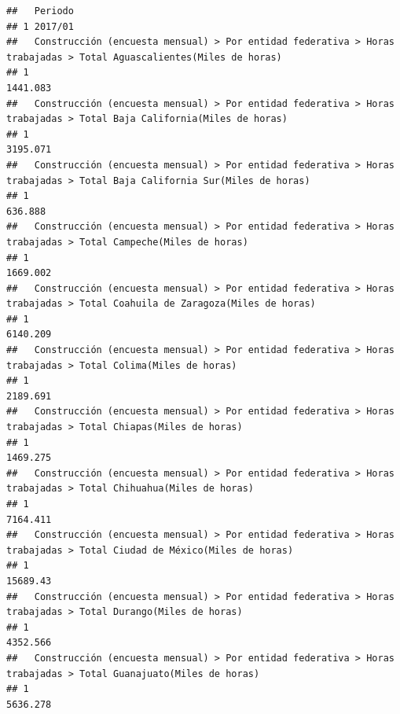 \documentclass[
]{article}
\begin{document}
\begin{verbatim}
##   Periodo
## 1 2017/01
##   Construcción (encuesta mensual) > Por entidad federativa > Horas trabajadas > Total Aguascalientes(Miles de horas) 
## 1                                                                                                            1441.083
##   Construcción (encuesta mensual) > Por entidad federativa > Horas trabajadas > Total Baja California(Miles de horas) 
## 1                                                                                                             3195.071
##   Construcción (encuesta mensual) > Por entidad federativa > Horas trabajadas > Total Baja California Sur(Miles de horas) 
## 1                                                                                                                  636.888
##   Construcción (encuesta mensual) > Por entidad federativa > Horas trabajadas > Total Campeche(Miles de horas) 
## 1                                                                                                      1669.002
##   Construcción (encuesta mensual) > Por entidad federativa > Horas trabajadas > Total Coahuila de Zaragoza(Miles de horas) 
## 1                                                                                                                  6140.209
##   Construcción (encuesta mensual) > Por entidad federativa > Horas trabajadas > Total Colima(Miles de horas) 
## 1                                                                                                    2189.691
##   Construcción (encuesta mensual) > Por entidad federativa > Horas trabajadas > Total Chiapas(Miles de horas) 
## 1                                                                                                     1469.275
##   Construcción (encuesta mensual) > Por entidad federativa > Horas trabajadas > Total Chihuahua(Miles de horas) 
## 1                                                                                                       7164.411
##   Construcción (encuesta mensual) > Por entidad federativa > Horas trabajadas > Total Ciudad de México(Miles de horas) 
## 1                                                                                                              15689.43
##   Construcción (encuesta mensual) > Por entidad federativa > Horas trabajadas > Total Durango(Miles de horas) 
## 1                                                                                                     4352.566
##   Construcción (encuesta mensual) > Por entidad federativa > Horas trabajadas > Total Guanajuato(Miles de horas) 
## 1                                                                                                        5636.278

\end{verbatim}
\end{document}
